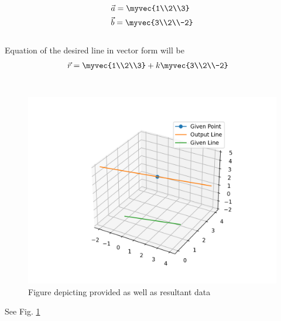 \begin{align}
&\vec{a}=\myvec{1\\2\\3}\\
&\vec{b}=\myvec{3\\2\\-2}
\end{align}\\
Equation of the desired line in vector form will be
\begin{align}
&\vec{r}=\myvec{1\\2\\3}+k\myvec{3\\2\\-2}
\end{align}\\
\begin{figure}[h!]
	\centering
	\includegraphics[width=\columnwidth]{./solutions/line_plane/67/Assignment_2_Figure.png}
	\caption{Figure depicting provided as well as resultant data}
	\label{myfig:solutions_line_plane_67_Assignment_2}
\end{figure}
See Fig. 	\ref{myfig:solutions_line_plane_67_Assignment_2}

